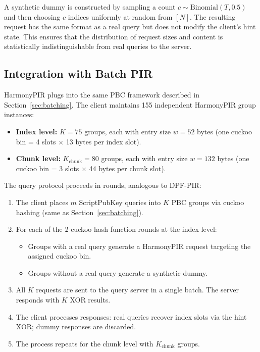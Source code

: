 A synthetic dummy is constructed by sampling a count $c \sim \text{Binomial}(T, 0.5)$ and then choosing $c$ indices uniformly at random from $[N]$. The resulting request has the same format as a real query but does not modify the client's hint state. This ensures that the distribution of request sizes and content is statistically indistinguishable from real queries to the server.

\subsection{Integration with Batch PIR}
\label{sec:harmony-batch}

HarmonyPIR plugs into the same PBC framework described in Section~\ref{sec:batching}. The client maintains 155 independent HarmonyPIR group instances:
\begin{itemize}[nolistsep,leftmargin=*]
    \item \textbf{Index level:} $K{=}75$ groups, each with entry size $w = 52$ bytes (one cuckoo bin = 4 slots $\times$ 13 bytes per index slot).
    \item \textbf{Chunk level:} $K_\text{chunk}{=}80$ groups, each with entry size $w = 132$ bytes (one cuckoo bin = 3 slots $\times$ 44 bytes per chunk slot).
\end{itemize}

The query protocol proceeds in rounds, analogous to DPF-PIR:
\begin{enumerate}[nolistsep,leftmargin=*]
    \item The client places $m$ ScriptPubKey queries into $K$ PBC groups via cuckoo hashing (same as Section~\ref{sec:batching}).
    \item For each of the 2 cuckoo hash function rounds at the index level:
    \begin{itemize}[nolistsep,leftmargin=*]
        \item Groups with a real query generate a HarmonyPIR request targeting the assigned cuckoo bin.
        \item Groups without a real query generate a synthetic dummy.
    \end{itemize}
    \item All $K$ requests are sent to the query server in a single batch. The server responds with $K$ XOR results.
    \item The client processes responses: real queries recover index slots via the hint XOR; dummy responses are discarded.
    \item The process repeats for the chunk level with $K_\text{chunk}$ groups.
\end{enumerate}

